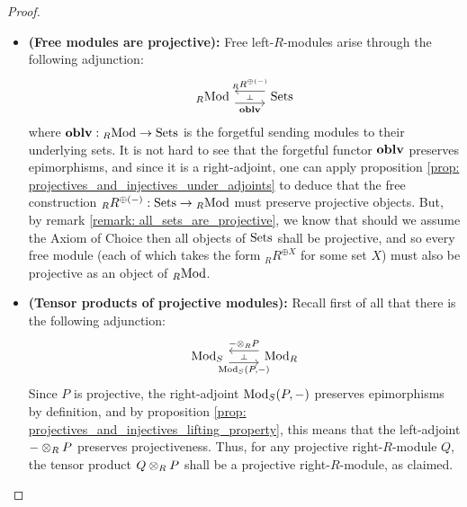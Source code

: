                     \begin{proof}
                        \noindent
                        \begin{itemize}
                            \item \textbf{(Free modules are projective):} Free left-$R$-modules arise through the following adjunction:
                                $$
                                    \begin{tikzcd}
                                    	{{}_R\Mod} & \Sets
                                    	\arrow[""{name=0, anchor=center, inner sep=0}, "\oblv"', shift right=2, from=1-1, to=1-2]
                                    	\arrow[""{name=1, anchor=center, inner sep=0}, "{{}_RR^{\oplus (-)}}"', shift right=2, from=1-2, to=1-1]
                                    	\arrow["\dashv"{anchor=center, rotate=-90}, draw=none, from=1, to=0]
                                    \end{tikzcd}
                                $$
                            where $\mathbf{oblv}: {}_R\mathrm{Mod} \to \mathrm{Sets}$ is the forgetful sending modules to their underlying sets. It is not hard to see that the forgetful functor $\mathbf{oblv}$ preserves epimorphisms, and since it is a right-adjoint, one can apply proposition \ref{prop: projectives_and_injectives_under_adjoints} to deduce that the free construction ${}_RR^{\oplus (-)}: \mathrm{Sets} \to {}_R\mathrm{Mod}$ must preserve projective objects. But, by remark \ref{remark: all_sets_are_projective}, we know that should we assume the Axiom of Choice then all objects of $\mathrm{Sets}$ shall be projective, and so every free module (each of which takes the form ${}_RR^{\oplus X}$ for some set $X$) must also be projective as an object of ${}_R\mathrm{Mod}$.
                            \item \textbf{(Tensor products of projective modules):} Recall first of all that there is the following adjunction:
                                $$
                                   \begin{tikzcd}
                                	{\Mod_S} & {\Mod_R}
                                	\arrow[""{name=0, anchor=center, inner sep=0}, "{- \tensor_R P}"', shift right=2, from=1-2, to=1-1]
                                	\arrow[""{name=1, anchor=center, inner sep=0}, "{\Mod_S(P, -)}"', shift right=2, from=1-1, to=1-2]
                                	\arrow["\dashv"{anchor=center, rotate=-90}, draw=none, from=0, to=1]
                                \end{tikzcd}
                                $$
                            Since $P$ is projective, the right-adjoint $\mathrm{Mod}_S(P, -)$ preserves epimorphisms by definition, and by proposition \ref{prop: projectives_and_injectives_lifting_property}, this means that the left-adjoint $- \tensor_R P$ preserves projectiveness. Thus, for any projective right-$R$-module $Q$, the tensor product $Q \tensor_R P$ shall be a projective right-$R$-module, as claimed.
                        \end{itemize}
                    \end{proof}
                
